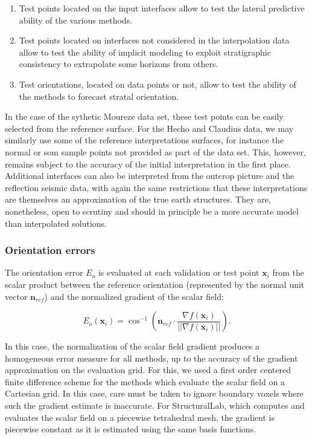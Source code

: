 \documentclass[preprint]{ring20}
\newcommand{\bx}{\mathbf{x}}
\newcommand{\bn}{\mathbf{n}}
\begin{document}
{\begin{enumerate}
	\item Test points located on the input interfaces allow to test the lateral predictive ability of the various methods.  
  \item Test points located on interfaces not considered in the interpolation data allow to test the ability of implicit modeling to exploit stratigraphic consistency to extrapolate some horizons from others. 
  \item Test orientations, located on data points or not, allow to test the ability of the methods to forecast stratal orientation. 
\end{enumerate}

In the case of the sythetic Moureze data set, these test points can be easily selected from the reference surface. For the Hecho and Claudius data, we may similarly use some of the reference interpretations surfaces, for instance the normal or som sample points not provided as part of the data set. This, however, remains subject to the accuracy of the initial interpretation in the first place. Additional interfaces can also be interpreted from the outcrop picture and the reflection seismic data, with again the same restrictions that these interpretations are themselves an approximation of the true earth structures. They are, nonetheless, open to scrutiny and should in principle be a more accurate model than interpolated solutions.

\subsubsection{Orientation errors}

The orientation error $E_o$ is evaluated at each validation or test point $\bx_i$ from the scalar product between the reference orientation (represented by the normal unit vector $\bn_{ref}$) and the normalized gradient of the scalar field:

\begin{equation}
\label{eq:erro}
E_o(\bx_i) = \cos^{-1} \left( \bn_{ref} \cdot \frac{\nabla f(\bx_i)}{||\nabla f(\bx_i)||} \right).
\end{equation}

In this case, the normalization of the scalar field gradient produces a homogeneous error measure for all methods, up to the accuracy of the gradient approximation on the evaluation grid. For this, we used a first order centered finite difference scheme for the methods which evaluate the scalar field on a Cartesian grid. In this case, care must be taken to ignore boundary voxels where such the gradient estimate is inaccurate. For StructuralLab, which computes and evaluates the scalar field on a piecewise tetrahedral mesh, the gradient is piecewise constant as it is estimated using the same basis functions. 

}
\end{document}
